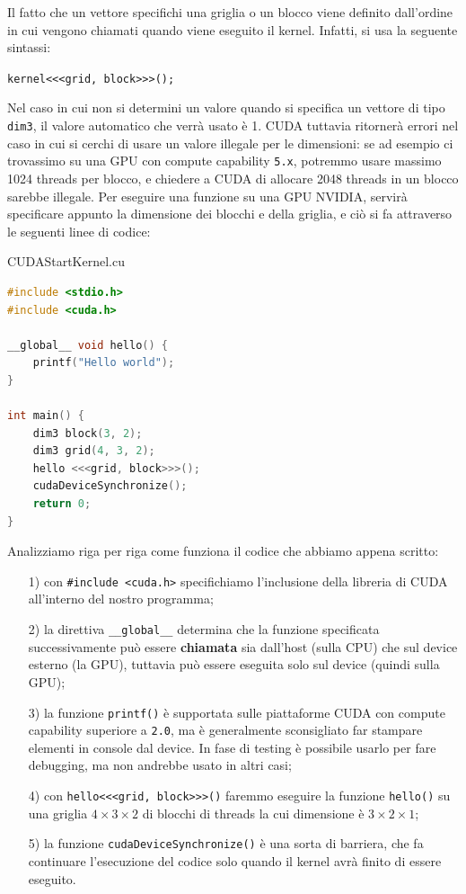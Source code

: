 Il fatto che un vettore specifichi una griglia o un blocco viene definito dall'ordine in cui vengono chiamati quando viene eseguito il kernel. Infatti, si usa la seguente sintassi:

\begin{center}
    \verb|kernel<<<grid, block>>>();|
\end{center}

Nel caso in cui non si determini un valore quando si specifica un vettore di tipo \verb|dim3|, il valore automatico che verrà usato è 1. CUDA tuttavia ritornerà errori nel caso in cui si cerchi di usare un valore illegale per le dimensioni: se ad esempio ci trovassimo su una GPU con compute capability \verb|5.x|, potremmo usare massimo 1024 threads per blocco, e chiedere a CUDA di allocare 2048 threads in un blocco sarebbe illegale.
\nl
Per eseguire una funzione su una GPU NVIDIA, servirà specificare appunto la dimensione dei blocchi e della griglia, e ciò si fa attraverso le seguenti linee di codice:

\begin{codeblock}{CUDAStartKernel.cu}
    \begin{lstlisting}[language = C]
#include <stdio.h>
#include <cuda.h>

__global__ void hello() {
    printf("Hello world");
}

int main() {
    dim3 block(3, 2);
    dim3 grid(4, 3, 2);
    hello <<<grid, block>>>();
    cudaDeviceSynchronize();
    return 0;
}\end{lstlisting}
\end{codeblock}

Analizziamo riga per riga come funziona il codice che abbiamo appena scritto:
\begin{itemize}
    \item [1)] con \verb|#include <cuda.h>| specifichiamo l'inclusione della libreria di CUDA all'interno del nostro programma;
    \item [2)] la direttiva \verb|__global__| determina che la funzione specificata successivamente può essere \textbf{chiamata} sia dall'host (sulla CPU) che sul device esterno (la GPU), tuttavia può essere eseguita solo sul device (quindi sulla GPU);
    \item [3)] la funzione \verb|printf()| è supportata sulle piattaforme CUDA con compute capability superiore a \verb|2.0|, ma è generalmente sconsigliato far stampare elementi in console dal device. In fase di testing è possibile usarlo per fare debugging, ma non andrebbe usato in altri casi;
    \item [4)] con \verb|hello<<<grid, block>>>()| faremmo eseguire la funzione \verb|hello()| su una griglia $4 \times 3 \times 2$ di blocchi di threads la cui dimensione è $3 \times 2 \times 1$;
    \item [5)] la funzione \verb|cudaDeviceSynchronize()| è una sorta di barriera, che fa continuare l'esecuzione del codice solo quando il kernel avrà finito di essere eseguito.
\end{itemize}

